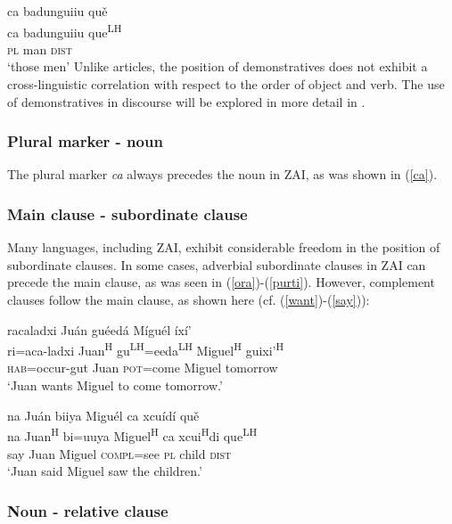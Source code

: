 \ea\label{ca2}
\glll ca badunguiiu qu\v{e} \\
ca badunguiiu que\textsuperscript{LH} \\
\textsc{pl} man \textsc{dist} \\
\glt `those men'
\z
Unlike articles, the position of demonstratives does not exhibit a cross-linguistic correlation with respect to the order of object and verb. The use of demonstratives in discourse will be explored in more detail in .


\subsubsection{Plural marker - noun}

The plural marker \textit{ca} always precedes the noun in ZAI, as was shown in (\ref{ca}). 


\subsubsection{Main clause - subordinate clause}

Many languages, including ZAI, exhibit considerable freedom in the position of subordinate clauses. In some cases, adverbial subordinate clauses in ZAI can precede the main clause, as was seen in (\ref{ora})-(\ref{purti}). However, complement clauses follow the main clause, as shown here (cf. (\ref{want})-(\ref{say})): 


\ea\label{want}
\glll racaladxi Ju\'{a}n gu\'{e}ed\'{a} M\'{i}gu\'{e}l \'{i}x\'{i}' \\
ri=aca-ladxi Juan\textsuperscript{H} gu\textsuperscript{LH}=eeda\textsuperscript{LH} Miguel\textsuperscript{H}  guixi'\textsuperscript{H}  \\
\textsc{hab}=occur-gut Juan \textsc{pot}=come Miguel tomorrow \\
\glt `Juan wants Miguel to come tomorrow.' 
\z

\ea\label{say}
\glll na Ju\'{a}n biiya Migu\'{e}l ca xcu\'{i}d\'{i} qu\v{e} \\
na Juan\textsuperscript{H} bi=uuya Miguel\textsuperscript{H} ca xcui\textsuperscript{H}di que\textsuperscript{LH} \\
say Juan Miguel \textsc{compl}=see \textsc{pl} child \textsc{dist} \\
\glt `Juan said Miguel saw the children.' 
\z

	
	
\subsubsection{Noun - relative clause}

